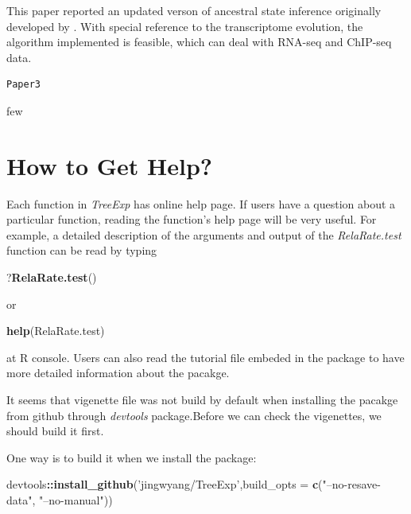 \documentclass[]{book}
\newenvironment{Shaded}{\begin{snugshade}}{\end{snugshade}}
\newcommand{\DataTypeTok}[1]{\textcolor[rgb]{0.13,0.29,0.53}{#1}}
\newcommand{\KeywordTok}[1]{\textcolor[rgb]{0.13,0.29,0.53}{\textbf{#1}}}
\newcommand{\NormalTok}[1]{#1}
\newcommand{\OperatorTok}[1]{\textcolor[rgb]{0.81,0.36,0.00}{\textbf{#1}}}
\newcommand{\StringTok}[1]{\textcolor[rgb]{0.31,0.60,0.02}{#1}}
\begin{document}
This paper\citep{YANG2018} reported an updated verson of ancestral state inference originally developed by \citep{gu2004}. With special reference to the transcriptome evolution, the algorithm implemented is feasible, which can deal with RNA-seq and ChIP-seq data.

\begin{verbatim}
Paper3
\end{verbatim}

few

\newpage

\hypertarget{how-to-get-help}{%
\section{How to Get Help?}\label{how-to-get-help}}

Each function in \emph{TreeExp} has online help page. If users have a question about a particular function, reading the function's help page will be very useful. For example, a detailed description of the arguments and output of the \emph{RelaRate.test} function can be read by typing

\begin{Shaded}
\begin{Highlighting}[]
\NormalTok{?}\KeywordTok{RelaRate.test}\NormalTok{()}
\end{Highlighting}
\end{Shaded}

or

\begin{Shaded}
\begin{Highlighting}[]
\KeywordTok{help}\NormalTok{(RelaRate.test)}
\end{Highlighting}
\end{Shaded}

at R console. Users can also read the tutorial file embeded in the package to have more detailed information about the pacakge.

It seems that vigenette file was not build by default when installing the pacakge from github through \emph{devtools} package.Before we can check the vigenettes, we should build it first.

One way is to build it when we install the package:

\begin{Shaded}
\begin{Highlighting}[]
\NormalTok{devtools}\OperatorTok{::}\KeywordTok{install_github}\NormalTok{(}\StringTok{'jingwyang/TreeExp'}\NormalTok{,}\DataTypeTok{build_opts =} \KeywordTok{c}\NormalTok{(}\StringTok{"--no-resave-data"}\NormalTok{, }\StringTok{"--no-manual"}\NormalTok{))}
\end{Highlighting}
\end{Shaded}
\end{document}
